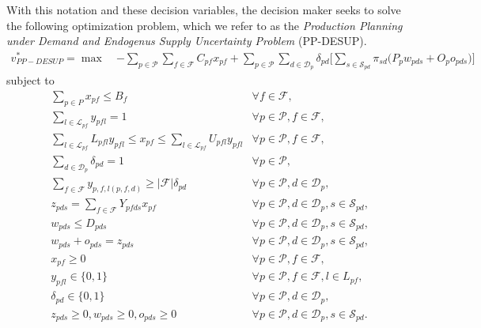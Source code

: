 \documentclass[12pt]{article}
\theoremstyle{thmstylethree}%
\begin{document}
With this notation and these decision variables, the decision maker seeks to solve the following optimization problem, which we refer to as the \textit{Production Planning under Demand and Endogenus Supply Uncertainty Problem} (PP-DESUP).
\begin{align}
\label{eq:model:obj}v_{PP-DESUP}^{*} = \max~&-\sum_{p\in\mathcal{P}}\sum_{f\in\mathcal{F}}C_{pf}x_{pf}+\sum_{p\in\mathcal{P}}\sum_{d\in\mathcal{D}_p}\delta_{pd}\Bigg[\sum_{s\in\mathcal{S}_{pd}}\pi_{sd}\bigg(P_p w_{pds}+O_{p}o_{pds}\bigg)\Bigg]
\end{align}
subject to
\begin{align}
\label{eq:model:c0} & \sum_{p \in P} x_{pf} \leq B_{f} & \forall f \in \mathcal{F}, \\
\label{eq:model:c1} &   \sum_{l\in\mathcal{L}_{pf}}y_{pfl} =1&\forall p\in\mathcal{P}, f\in\mathcal{F},  \\
\label{eq:model:c2} &   \sum_{l\in\mathcal{L}_{pf}}L_{pfl}y_{pfl} \leq x_{pf}\leq \sum_{l\in\mathcal{L}_{pf}}U_{pfl}y_{pfl}&\forall p\in\mathcal{P}, f\in\mathcal{F}, \\ 
\label{eq:model:c3}    & \sum_{d\in\mathcal{D}_p}\delta_{pd} = 1 & \forall p\in\mathcal{P}, \\
\label{eq:model:c4} &\sum_{f\in\mathcal{F}}y_{p,f,l(p,f,d)}\geq |\mathcal{F}|\delta_{pd} &\forall p\in\mathcal{P}, d\in \mathcal{D}_p, \\
\label{eq:model:c5}  &z_{pds}= \sum_{f\in\mathcal{F}}Y_{pfds}x_{pf} & \forall p\in\mathcal{P}, d\in\mathcal{D}_p, s\in\mathcal{S}_{pd}, \\
\label{eq:model:c6}  &w_{pds}\leq D_{pds}&\forall p\in\mathcal{P}, d\in\mathcal{D}_p, s\in\mathcal{S}_{pd},\\
\label{eq:model:c7}    &w_{pds} + o_{pds} = z_{pds} & \forall p\in\mathcal{P}, d\in\mathcal{D}_p, s\in\mathcal{S}_{pd}, \\
\label{eq:model:fs_dvx} & x_{pf} \geq 0  &\forall p\in\mathcal{P}, f\in\mathcal{F}, \\ 
\label{eq:model:fs_dvy} & y_{pfl} \in \{0,1\} &\forall p\in\mathcal{P}, f\in\mathcal{F}, l \in L_{pf}, \\
\label{eq:model:fs_dvd} & \delta_{pd} \in \{0,1\} &\forall p\in\mathcal{P}, d \in \mathcal{D}_{p}, \\
\label{eq:model:ss_dvs} & z_{pds} \geq 0, w_{pds} \geq 0, o_{pds} \geq 0 & \forall p \in \mathcal{P}, d \in \mathcal{D}_{p}, s \in \mathcal{S}_{pd}.
\end{align}
\end{document}
